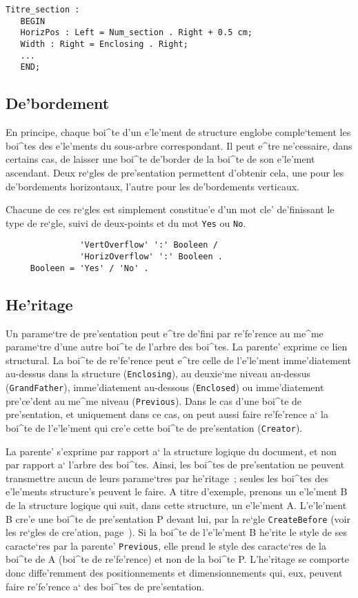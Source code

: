 {\begin{example}
\begin{verbatim}
Titre_section :
   BEGIN
   HorizPos : Left = Num_section . Right + 0.5 cm;
   Width : Right = Enclosing . Right;
   ...
   END;
\end{verbatim}
\end{example}

\subsection{De'bordement}

En principe, chaque boi^te d'un e'le'ment de structure englobe comple`tement
les boi^tes des e'le'ments du sous-arbre correspondant. Il peut e^tre
ne'cessaire, dans certains cas, de laisser une boi^te de'border de la boi^te
de son e'le'ment ascendant. Deux re`gles de pre'sentation permettent
d'obtenir cela, une pour les de'bordements horizontaux, l'autre pour les
de'bordements verticaux.

Chacune de ces re`gles est simplement constitue'e d'un mot cle' de'finissant
le type de re`gle, suivi de deux-points et du mot {\tt Yes} ou {\tt No}.

\begin{verbatim}
               'VertOverflow' ':' Booleen /
               'HorizOverflow' ':' Booleen .
     Booleen = 'Yes' / 'No' .
\end{verbatim}

\subsection{He'ritage}

Un parame`tre de pre'sentation peut e^tre de'fini par re'fe'rence au me^me
parame`tre d'une
autre boi^te de l'arbre des boi^tes. La parente' exprime ce lien structural.
La boi^te de re'fe'rence peut e^tre celle de l'e'le'ment imme'diatement
au-dessus dans la structure ({\tt Enclosing}), au deuxie`me niveau au-dessus
({\tt GrandFather}), imme'diatement au-dessous ({\tt Enclosed})
ou imme'diatement pre'ce'dent au me^me niveau ({\tt Previous}).
Dans le cas d'une boi^te de pre'sentation, et uniquement dans ce cas, on peut
aussi faire re'fe'rence a` la boi^te de l'e'le'ment qui cre'e cette boi^te de
pre'sentation ({\tt Creator}).

La parente' s'exprime
par rapport a` la structure logique du document, et non par rapport a` l'arbre
des boi^tes. Ainsi, les boi^tes de pre'sentation ne peuvent transmettre aucun
de leurs parame`tres par he'ritage~; seules les boi^tes des e'le'ments structure's
peuvent le faire. A titre d'exemple, prenons un e'le'ment B de la structure
logique qui suit, dans cette structure, un e'le'ment A. L'e'le'ment B cre'e
une boi^te de pre'sentation P devant lui, par la re`gle {\tt CreateBefore}
(voir les re`gles de cre'ation, page~\pageref{creation}). Si la boi^te de
l'e'le'ment B he'rite le style de ses caracte`res par la parente' {\tt Previous},
elle prend le style des caracte`res de la boi^te de A (boi^te de re'fe'rence)
et non de la boi^te P. L'he'ritage se comporte donc diffe'remment des
positionnements et dimensionnements qui, eux, peuvent faire re'fe'rence a`
des boi^tes de pre'sentation.

}
